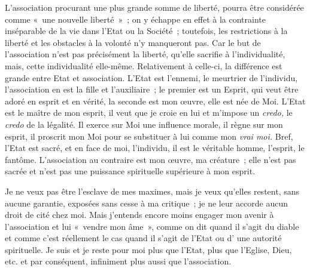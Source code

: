 \documentclass[french,twoside]{book} %
\begin{document}
L’association procurant une plus grande somme de liberté, pourra être considérée comme « une nouvelle liberté » ; on y échappe en effet à la contrainte inséparable de la vie dans l’Etat ou la Société ; toutefois, les restrictions à la liberté et les obstacles à la volonté n’y manqueront pas. Car le but de l’association n’est pas précisément la liberté, qu’elle sacrifie à l’individualité, mais, cette individualité elle-même. Relativement à celle-ci, la différence est grande entre Etat et association. L’Etat est l’ennemi, le meurtrier de l’individu, l’association en est la fille et l’auxiliaire ; le premier est un Esprit, qui veut être adoré en esprit et en vérité, la seconde est mon œuvre, elle est née de Moi. L’Etat est le maître de mon esprit, il veut que je croie en lui et m’impose un \emph{credo,} le \emph{credo} de la légalité. Il exerce sur Moi une influence morale, il règne sur mon esprit, il proscrit mon Moi pour se substituer à lui comme mon \emph{vrai moi.} Bref, l’Etat est sacré, et en face de moi, l’individu, il est le véritable homme, l’esprit, le fantôme. L’association au contraire est mon œuvre, ma créature ; elle n’est pas sacrée et n’est pas une puissance spirituelle supérieure à mon esprit.\par
Je ne veux pas être l’esclave de mes maximes, mais je veux qu’elles restent, sans aucune garantie, exposées sans cesse à ma critique ; je ne leur accorde aucun droit de cité chez moi. Mais j’entends encore moins engager mon avenir à l’association et lui « vendre mon âme », comme on dit quand il s’agit du diable  et comme c’est réellement le cas quand il s’agit de l’Etat ou d’ une autorité spirituelle. Je suis et je reste pour moi plus que l’Etat, plus que l’Eglise, Dieu, etc. et par conséquent, infiniment plus aussi que l’association.\par
\end{document}
